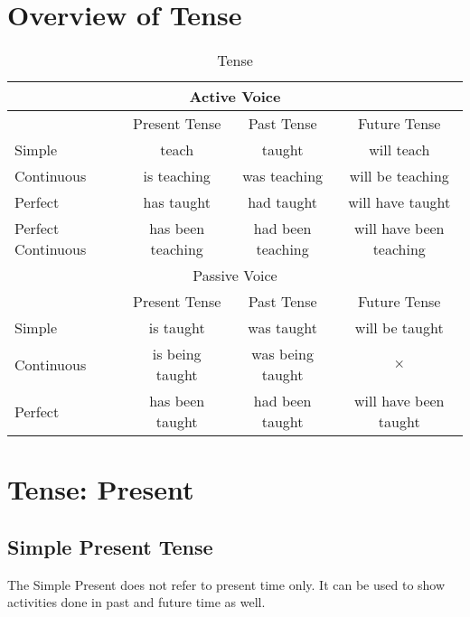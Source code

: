 \onecolumn
\section{Overview of Tense}
\begin{table}[h]
    \centering
    \begin{tabular}{|l|c|c|c|}
        \hline
        \multicolumn{4}{|c|}{Active Voice} \\ \hline
        & Present Tense & Past Tense & Future Tense \\ \hline
        Simple & teach & taught & will teach \\ \hline
        Continuous & is teaching & was teaching & will be teaching \\ \hline
        Perfect & has taught & had taught & will have taught \\ \hline
        Perfect Continuous & has been teaching & had been teaching & will have been teaching \\ \hline \hline
        \multicolumn{4}{|c|}{Passive Voice} \\ \hline
        & Present Tense & Past Tense & Future Tense \\ \hline
        Simple & is taught & was taught & will be taught \\ \hline
        Continuous & is being taught & was being taught & $\times$ \\ \hline
        Perfect & has been taught & had been taught & will have been taught \\ \hline
    \end{tabular}
    \caption{Tense}
\end{table}

\section{Tense: Present}
\subsection{Simple Present Tense}
The Simple Present does not refer to present time only.
It can be used to show activities done in past and future time as well.

